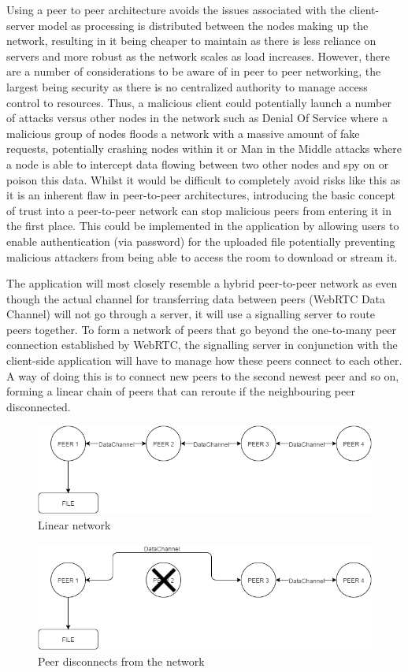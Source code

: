 \documentclass[]{report}
\begin{document}
	Using a peer to peer architecture avoids the issues associated with the client-server model as processing is distributed between the nodes making up the network, resulting in it being cheaper to maintain as there is less reliance on servers and more robust as the network scales as load increases. However, there are a number of considerations to be aware of in peer to peer networking, the largest being security as there is no centralized authority to manage access control to resources. Thus, a malicious client could potentially launch a number of attacks versus other nodes in the network such as Denial Of Service where a malicious group of nodes floods a network with a massive amount of fake requests, potentially crashing nodes within it or Man in the Middle  attacks where a node is able to intercept data flowing between two other nodes and spy on or poison this data\cite{P2P Security Issues}. Whilst it would be difficult to completely avoid risks like this as it is an inherent flaw in peer-to-peer architectures, introducing the basic concept of trust into a peer-to-peer network can stop malicious peers from entering it in the first place. This could be implemented in the application by allowing users to enable authentication (via password) for the uploaded file potentially preventing malicious attackers from being able to access the room to download or stream it. 
	
	The application will most closely resemble a hybrid peer-to-peer network as even though the actual channel for transferring data between peers (WebRTC Data Channel) will not go through a server, it will use a signalling server to route peers together. To form a network of peers that go beyond the one-to-many peer connection established by WebRTC, the signalling server in conjunction with the client-side application will have to manage how these peers connect to each other. A way of doing this is to connect new peers to the second newest peer and so on, forming a linear chain of peers that can reroute if the neighbouring peer disconnected.
	\begin{figure}[H]
		\centering
		\caption{Linear network}
		\includegraphics[scale=0.4]{network.png}
	\end{figure}
	\begin{figure}[H]
		\centering
		\caption{Peer disconnects from the network}
		\includegraphics[scale=0.4]{peerdisconnect.png}
	\end{figure}
	
\end{document}
